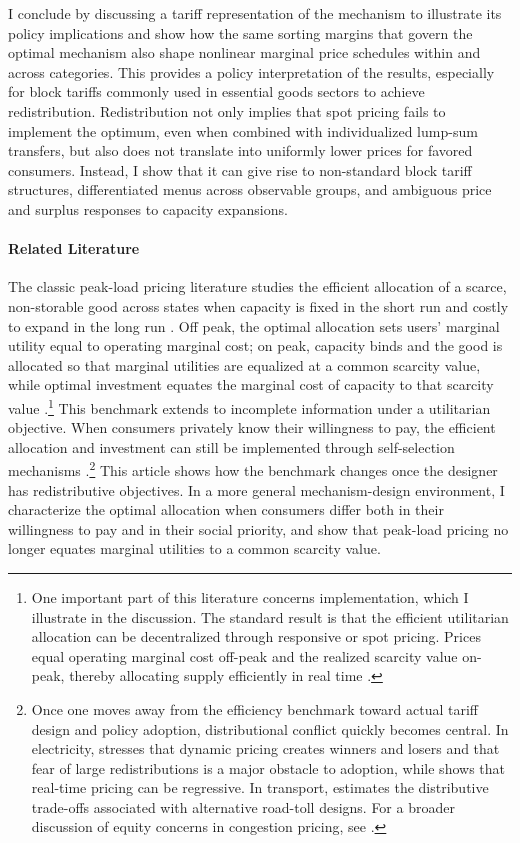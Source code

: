 \documentclass{class}
\begin{document}
I conclude by discussing a tariff representation of the mechanism to illustrate its policy implications and show how the same sorting margins that govern the optimal mechanism also shape nonlinear marginal price schedules within and across categories. This provides a policy interpretation of the results, especially for block tariffs commonly used in essential goods sectors to achieve redistribution. Redistribution not only implies that spot pricing fails to implement the optimum, even when combined with individualized lump-sum transfers, but also does not translate into uniformly lower prices for favored consumers. Instead, I show that it can give rise to non-standard block tariff structures, differentiated menus across observable groups, and ambiguous price and surplus responses to capacity expansions.

\paragraph{Related Literature} The classic peak-load pricing literature studies the efficient allocation of a scarce, non-storable good across states when capacity is fixed in the short run and costly to expand in the long run \citep{m1949tarification,Steiner1957,vickrey1963pricing}. Off peak, the optimal allocation sets users' marginal utility equal to operating marginal cost; on peak, capacity binds and the good is allocated so that marginal utilities are equalized at a common scarcity value, while optimal investment equates the marginal cost of capacity to that scarcity value \citep{crew1995theory,vickrey1969congestion}.\footnote{One important part of this literature concerns implementation, which I illustrate in the discussion. The standard result is that the efficient utilitarian allocation can be decentralized through responsive or spot pricing. Prices equal operating marginal cost off-peak and the realized scarcity value on-peak, thereby allocating supply efficiently in real time \citep{Vickrey,Schweppe1988}.} This benchmark extends to incomplete information under a utilitarian objective. When consumers privately know their willingness to pay, the efficient allocation and investment can still be implemented through self-selection mechanisms \citep{spulber1992optimal,chao1987priority}.\footnote{Once one moves away from the efficiency benchmark toward actual tariff design and policy adoption, distributional conflict quickly becomes central. In electricity, \cite{Joskow2012} stresses that dynamic pricing creates winners and losers and that fear of large redistributions is a major obstacle to adoption, while \cite{cahana2022distributional} shows that real-time pricing can be regressive. In transport, \cite{hall2021can} estimates the distributive trade-offs associated with alternative road-toll designs. For a broader discussion of equity concerns in congestion pricing, see \cite{Ecola}.} This article shows how the benchmark changes once the designer has redistributive objectives. In a more general mechanism-design environment, I characterize the optimal allocation when consumers differ both in their willingness to pay and in their social priority, and show that peak-load pricing no longer equates marginal utilities to a common scarcity value. 
\end{document}
